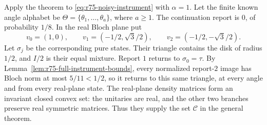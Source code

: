 Apply the theorem to \eqref{eq:r75-noisy-instrument} with $\alpha=1$.
Let the finite known angle alphabet be
$\Theta=\{\theta_1,\ldots,\theta_a\}$, where $a\ge1$.
The continuation report is $0$, of probability $1/8$.
In the real Bloch plane put
\[
 v_0=(1,0),\qquad
 v_1=(-1/2,\sqrt3/2),\qquad
 v_2=(-1/2,-\sqrt3/2).
\]
Let $\sigma_j$ be the corresponding pure states.  Their triangle contains
the disk of radius $1/2$, and $I/2$ is their equal mixture.
Report $1$ returns to $\sigma_0=\tau$.  By
Lemma~\ref{lem:r75-full-instrument-bounds}, every normalized report-$2$
image has Bloch norm at most $5/11<1/2$, so it returns to this same
triangle, at every angle and from every real-plane state.
The real-plane density matrices form an invariant closed convex set:
the unitaries are real, and the other two branches preserve real symmetric
matrices.  Thus they supply the set $\mathcal C$ in the general theorem.

